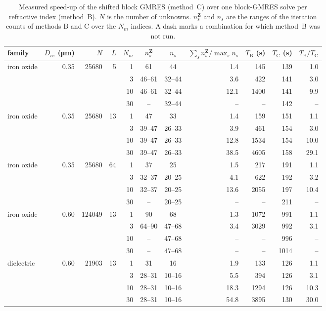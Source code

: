 \documentclass[11pt,a4paper]{article}
\begin{document}
\begin{table}[htbp]
  \centering
  \caption{Measured speed-up of the shifted block GMRES (method~C)
           over one block-GMRES solve per refractive index (method~B).
           $N$ is the number of unknowns.
           $n_s^{\mathbf{Z}}$ and $n_s$ are the ranges of the iteration
           counts of methods B and C over the $N_m$ indices.
           A dash marks a combination for which method~B was not run.}
  \label{tab:shift-benchmark}
  \vspace{0.6ex}
  \small
  \setlength{\tabcolsep}{4pt}
  \begin{tabular}{lrrrrccrrrr}
    \toprule
    family & $D_{ve}$ (\si{\micro\meter}) & $N$ & $L$ & $N_m$
      & $n_s^{\mathbf{Z}}$ & $n_s$
      & $\sum_s n_s^{\mathbf{Z}} / \max_s n_s$
      & $T_{\text{B}}$ (\si{\second}) & $T_{\text{C}}$ (\si{\second})
      & $T_{\text{B}} / T_{\text{C}}$ \\
    \midrule
    iron oxide & 0.35 & \num{25680} & 5 & 1 & 61 & 44 & 1.4 & 145 & 139 & 1.0 \\
     & & & & 3 & 46--61 & 32--44 & 3.6 & 422 & 141 & 3.0 \\
     & & & & 10 & 46--61 & 32--44 & 12.1 & 1400 & 141 & 9.9 \\
     & & & & 30 & -- & 32--44 & -- & -- & 142 & -- \\
    \addlinespace
    iron oxide & 0.35 & \num{25680} & 13 & 1 & 47 & 33 & 1.4 & 159 & 151 & 1.1 \\
     & & & & 3 & 39--47 & 26--33 & 3.9 & 461 & 154 & 3.0 \\
     & & & & 10 & 39--47 & 26--33 & 12.8 & 1534 & 154 & 10.0 \\
     & & & & 30 & 39--47 & 26--33 & 38.5 & 4605 & 158 & 29.1 \\
    \addlinespace
    iron oxide & 0.35 & \num{25680} & 64 & 1 & 37 & 25 & 1.5 & 217 & 191 & 1.1 \\
     & & & & 3 & 32--37 & 20--25 & 4.1 & 622 & 192 & 3.2 \\
     & & & & 10 & 32--37 & 20--25 & 13.6 & 2055 & 197 & 10.4 \\
     & & & & 30 & -- & 20--25 & -- & -- & 211 & -- \\
    \addlinespace
    iron oxide & 0.60 & \num{124049} & 13 & 1 & 90 & 68 & 1.3 & 1072 & 991 & 1.1 \\
     & & & & 3 & 64--90 & 47--68 & 3.4 & 3029 & 992 & 3.1 \\
     & & & & 10 & -- & 47--68 & -- & -- & 996 & -- \\
     & & & & 30 & -- & 47--68 & -- & -- & 1014 & -- \\
    \addlinespace
    dielectric & 0.60 & \num{21903} & 13 & 1 & 31 & 16 & 1.9 & 133 & 126 & 1.1 \\
     & & & & 3 & 28--31 & 10--16 & 5.5 & 394 & 126 & 3.1 \\
     & & & & 10 & 28--31 & 10--16 & 18.3 & 1294 & 126 & 10.3 \\
     & & & & 30 & 28--31 & 10--16 & 54.8 & 3895 & 130 & 30.0 \\
    \bottomrule
  \end{tabular}
\end{table}
\end{document}
